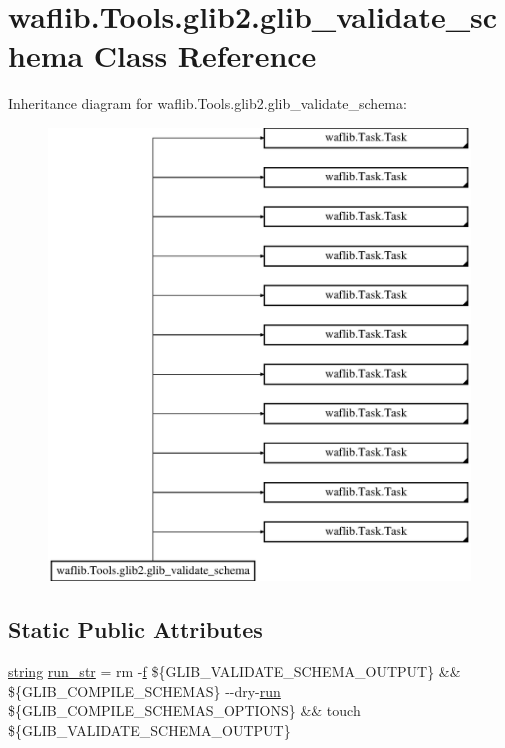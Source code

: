 \hypertarget{classwaflib_1_1_tools_1_1glib2_1_1glib__validate__schema}{}\section{waflib.\+Tools.\+glib2.\+glib\+\_\+validate\+\_\+schema Class Reference}
\label{classwaflib_1_1_tools_1_1glib2_1_1glib__validate__schema}
Inheritance diagram for waflib.\+Tools.\+glib2.\+glib\+\_\+validate\+\_\+schema\+:\begin{figure}[H]
\begin{center}
\leavevmode
\includegraphics[height=12.000000cm]{classwaflib_1_1_tools_1_1glib2_1_1glib__validate__schema}
\end{center}
\end{figure}
\subsection*{Static Public Attributes}
\begin{DoxyCompactItemize}
\item 
\hyperlink{test__lib_f_l_a_c_2format_8c_ab02026ad0de9fb6c1b4233deb0a00c75}{string} \hyperlink{classwaflib_1_1_tools_1_1glib2_1_1glib__validate__schema_acca7a7fdb13eca1a2fdc3251fc382749}{run\+\_\+str} = \textquotesingle{}rm -\/\hyperlink{checksum_8c_ae747d72a1a803f5ff4a4b2602857d93b}{f} \$\{G\+L\+I\+B\+\_\+\+V\+A\+L\+I\+D\+A\+T\+E\+\_\+\+S\+C\+H\+E\+M\+A\+\_\+\+O\+U\+T\+P\+UT\} \&\& \$\{G\+L\+I\+B\+\_\+\+C\+O\+M\+P\+I\+L\+E\+\_\+\+S\+C\+H\+E\+M\+AS\} -\/-\/dry-\/\hyperlink{classwaflib_1_1_task_1_1_task_base_ae549bc1a80fd94cc94fd1e764c76895c}{run} \$\{G\+L\+I\+B\+\_\+\+C\+O\+M\+P\+I\+L\+E\+\_\+\+S\+C\+H\+E\+M\+A\+S\+\_\+\+O\+P\+T\+I\+O\+NS\} \&\& touch \$\{G\+L\+I\+B\+\_\+\+V\+A\+L\+I\+D\+A\+T\+E\+\_\+\+S\+C\+H\+E\+M\+A\+\_\+\+O\+U\+T\+P\+UT\}\textquotesingle{}
\end{DoxyCompactItemize}
